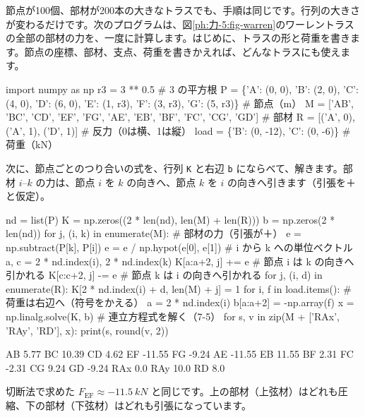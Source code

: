 \noindent 節点が100個、部材が200本の大きなトラスでも、手順は同じです。行列の大きさが変わるだけです。次のプログラムは、図\ref{ph:力-5:fig-warren}のワーレントラスの全部の部材の力を、一度に計算します。はじめに、トラスの形と荷重を書きます。節点の座標、部材、支点、荷重を書きかえれば、どんなトラスにも使えます。

\begin{phcode}
import numpy as np
r3 = 3 ** 0.5                     \# 3 の平方根
P = \{'A': (0, 0), 'B': (2, 0), 'C': (4, 0), 'D': (6, 0),
     'E': (1, r3), 'F': (3, r3), 'G': (5, r3)\}  \# 節点（m）
M = ['AB', 'BC', 'CD', 'EF', 'FG', 'AE', 'EB',
     'BF', 'FC', 'CG', 'GD']        \# 部材
R = [('A', 0), ('A', 1), ('D', 1)]  \# 反力（0は横、1は縦）
load = \{'B': (0, -12), 'C': (0, -6)\}  \# 荷重（kN）
\end{phcode}
次に、節点ごとのつり合いの式を、行列 \texttt{K} と右辺 \texttt{b} にならべて、解きます。部材 $i$–$k$ の力は、節点 $i$ を $k$ の向きへ、節点 $k$ を $i$ の向きへ引きます（引張を＋と仮定）。
\begin{phcode}
nd = list(P)
K = np.zeros((2 * len(nd), len(M) + len(R)))
b = np.zeros(2 * len(nd))
for j, (i, k) in enumerate(M):      \# 部材の力（引張が＋）
    e = np.subtract(P[k], P[i])
    e = e / np.hypot(e[0], e[1])    \# i から k への単位ベクトル
    a, c = 2 * nd.index(i), 2 * nd.index(k)
    K[a:a+2, j] += e                \# 節点 i は k の向きへ引かれる
    K[c:c+2, j] -= e                \# 節点 k は i の向きへ引かれる
for j, (i, d) in enumerate(R):
    K[2 * nd.index(i) + d, len(M) + j] = 1
for i, f in load.items():           \# 荷重は右辺へ（符号をかえる）
    a = 2 * nd.index(i)
    b[a:a+2] = -np.array(f)
x = np.linalg.solve(K, b)           \# 連立方程式を解く（7-5）
for s, v in zip(M + ['RAx', 'RAy', 'RD'], x):
    print(s, round(v, 2))
\end{phcode}
\begin{phcodeout}
AB 5.77
BC 10.39
CD 4.62
EF -11.55
FG -9.24
AE -11.55
EB 11.55
BF 2.31
FC -2.31
CG 9.24
GD -9.24
RAx 0.0
RAy 10.0
RD 8.0
\end{phcodeout}
切断法で求めた $F_{\mathrm{EF}}\approx\qty{-11.5}{kN}$ と同じです。上の部材（上弦材）はどれも圧縮、下の部材（下弦材）はどれも引張になっています。


